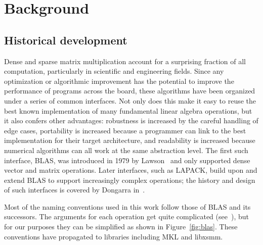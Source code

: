 \chapter{Background}
\label{chapter:review}

\section{Historical development}

Dense and sparse matrix multiplication account for a surprising fraction of all computation, particularly in scientific and engineering fields. Since any optimization or algorithmic improvement has the potential to improve the performance of programs across the board, these algorithms have been organized under a series of common interfaces. Not only does this make it easy to reuse the best known implementation of many fundamental linear algebra operations, but it also confers other advantages: robustness is increased by the careful handling of edge cases, portability is increased because a programmer can link to the best implementation for their target architecture, and readability is increased because numerical algorithms can all work at the same abstraction level. The first such interface, \gls{BLAS}, was introduced in 1979 by Lawson~\cite{Lawson:1979:BLA:355841.355847} and only supported dense vector and matrix operations. Later interfaces, such as LAPACK, build upon and extend \gls{BLAS} to support increasingly complex operations; the history and design of such interfaces is covered by Dongarra in~\cite{Dongarra:1998:NLA:552704}. 

Most of the naming conventions used in this work follow those of BLAS and its successors. The arguments for each operation get quite complicated (see~\cite{IntelCSCMM}), but for our purposes they can be simplified as shown in Figure~\ref{fig:blas}. These conventions have propagated to libraries including MKL and libxsmm.

